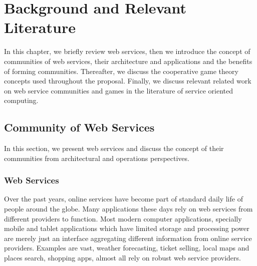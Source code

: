 \setcounter{chapter}{1}

\chapter{Background and Relevant Literature}\label{sec:MAS}

In this chapter, we briefly review web services, then we introduce
the concept of communities of web services, their architecture and
applications and the benefits of forming communities. Thereafter,
we discuss the cooperative game theory concepts used throughout
the proposal. Finally, we discuss relevant related work on web
service communities and games in the literature of service
oriented computing.

    \section{Community of Web Services}\label{sec:CommunityWS}
    In this section, we present web services and discuss the concept
    of their communities from architectural and operations
    perspectives.

        \subsection{Web Services}\label{sec:CWSWebServices}
        Over the past years, online services have become part of standard daily life of people around the globe. Many applications these days rely on
        web services from different providers to function. Most modern computer applications, specially
        mobile and tablet applications which have limited storage and processing power
        are merely just an interface aggregating different information from online service providers.
        Examples are vast, weather forecasting, ticket selling, local maps and places search, shopping apps, almost all rely on
        robust web service providers.

